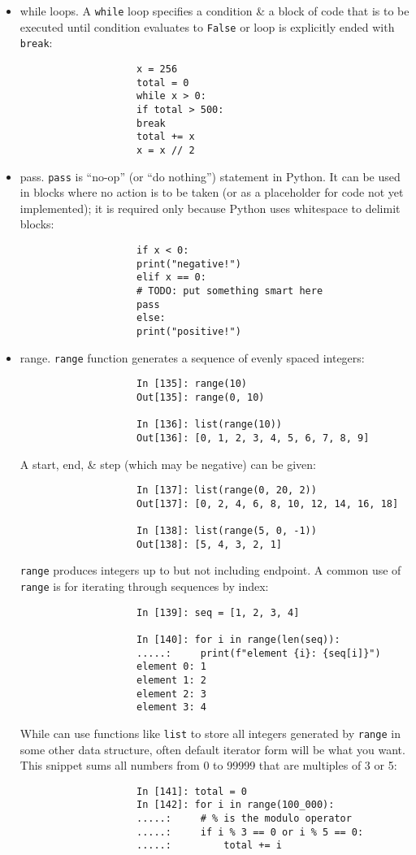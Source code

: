 \documentclass{article}
\begin{document}
\begin{itemize}
\begin{itemize}
\begin{itemize}
\begin{itemize}
\begin{verbatim}
				\end{verbatim}
				\item {\sf while loops.} A {\tt while} loop specifies a condition \& a block of code that is to be executed until condition evaluates to {\tt False} or loop is explicitly ended with {\tt break}:
				\begin{verbatim}
					x = 256
					total = 0
					while x > 0:
					if total > 500:
					break
					total += x
					x = x // 2
				\end{verbatim}
				\item {\sf pass.} {\tt pass} is ``no-op'' (or ``do nothing'') statement in Python. It can be used in blocks where no action is to be taken (or as a placeholder for code not yet implemented); it is required only because Python uses whitespace to delimit blocks:
				\begin{verbatim}
					if x < 0:
					print("negative!")
					elif x == 0:
					# TODO: put something smart here
					pass
					else:
					print("positive!")
				\end{verbatim}
				\item {\sf range.} {\tt range} function generates a sequence of evenly spaced integers:
				\begin{verbatim}
					In [135]: range(10)
					Out[135]: range(0, 10)
					
					In [136]: list(range(10))
					Out[136]: [0, 1, 2, 3, 4, 5, 6, 7, 8, 9]
				\end{verbatim}
				A start, end, \& step (which may be negative) can be given:
				\begin{verbatim}
					In [137]: list(range(0, 20, 2))
					Out[137]: [0, 2, 4, 6, 8, 10, 12, 14, 16, 18]
					
					In [138]: list(range(5, 0, -1))
					Out[138]: [5, 4, 3, 2, 1]
				\end{verbatim}
				{\tt range} produces integers up to but not including endpoint. A common use of {\tt range} is for iterating through sequences by index:
				\begin{verbatim}
					In [139]: seq = [1, 2, 3, 4]
					
					In [140]: for i in range(len(seq)):
					.....:     print(f"element {i}: {seq[i]}")
					element 0: 1
					element 1: 2
					element 2: 3
					element 3: 4
				\end{verbatim}
				While can use functions like {\tt list} to store all integers generated by {\tt range} in some other data structure, often default iterator form will be what you want. This snippet sums all numbers from 0 to 99999 that are multiples of 3 or 5:
				\begin{verbatim}
					In [141]: total = 0
					In [142]: for i in range(100_000):
					.....:     # % is the modulo operator
					.....:     if i % 3 == 0 or i % 5 == 0:
					.....:         total += i
					

\end{verbatim}
\end{itemize}
\end{itemize}
\end{itemize}
\end{itemize}
\end{document}
